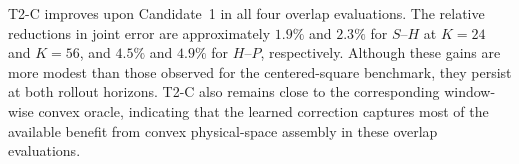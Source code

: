 T2-C improves upon Candidate~1 in all four overlap evaluations.
The relative reductions in joint error are approximately $1.9\%$ and
$2.3\%$ for $S$--$H$ at $K=24$ and $K=56$, and $4.5\%$ and $4.9\%$
for $H$--$P$, respectively. Although these gains are more modest than those observed for the centered-square benchmark, they persist at both rollout horizons. T2-C also remains close to the corresponding window-wise convex oracle, indicating that the learned correction captures most of the available benefit from convex physical-space assembly in these overlap evaluations.
